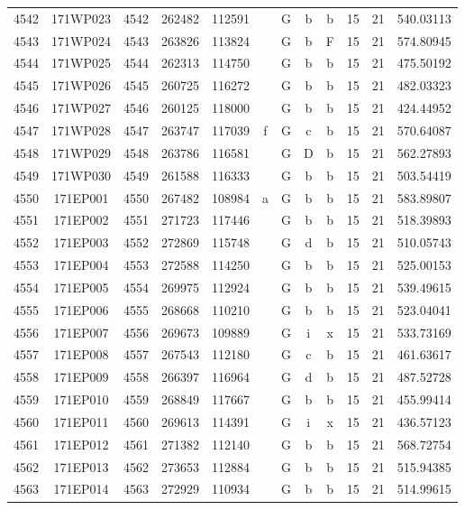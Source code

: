 \begin{tabular}{|*{12}{c|}}
4542 & 171WP023 & 4542 & 262482 & 112591 &  & G & b & b & 15 & 21 & 540.03113 \\ 
4543 & 171WP024 & 4543 & 263826 & 113824 &  & G & b & F & 15 & 21 & 574.80945 \\ 
4544 & 171WP025 & 4544 & 262313 & 114750 &  & G & b & b & 15 & 21 & 475.50192 \\ 
4545 & 171WP026 & 4545 & 260725 & 116272 &  & G & b & b & 15 & 21 & 482.03323 \\ 
4546 & 171WP027 & 4546 & 260125 & 118000 &  & G & b & b & 15 & 21 & 424.44952 \\ 
4547 & 171WP028 & 4547 & 263747 & 117039 & f & G & c & b & 15 & 21 & 570.64087 \\ 
4548 & 171WP029 & 4548 & 263786 & 116581 &  & G & D & b & 15 & 21 & 562.27893 \\ 
4549 & 171WP030 & 4549 & 261588 & 116333 &  & G & b & b & 15 & 21 & 503.54419 \\ 
4550 & 171EP001 & 4550 & 267482 & 108984 & a & G & b & b & 15 & 21 & 583.89807 \\ 
4551 & 171EP002 & 4551 & 271723 & 117446 &  & G & b & b & 15 & 21 & 518.39893 \\ 
4552 & 171EP003 & 4552 & 272869 & 115748 &  & G & d & b & 15 & 21 & 510.05743 \\ 
4553 & 171EP004 & 4553 & 272588 & 114250 &  & G & b & b & 15 & 21 & 525.00153 \\ 
4554 & 171EP005 & 4554 & 269975 & 112924 &  & G & b & b & 15 & 21 & 539.49615 \\ 
4555 & 171EP006 & 4555 & 268668 & 110210 &  & G & b & b & 15 & 21 & 523.04041 \\ 
4556 & 171EP007 & 4556 & 269673 & 109889 &  & G & i & x & 15 & 21 & 533.73169 \\ 
4557 & 171EP008 & 4557 & 267543 & 112180 &  & G & c & b & 15 & 21 & 461.63617 \\ 
4558 & 171EP009 & 4558 & 266397 & 116964 &  & G & d & b & 15 & 21 & 487.52728 \\ 
4559 & 171EP010 & 4559 & 268849 & 117667 &  & G & b & b & 15 & 21 & 455.99414 \\ 
4560 & 171EP011 & 4560 & 269613 & 114391 &  & G & i & x & 15 & 21 & 436.57123 \\ 
4561 & 171EP012 & 4561 & 271382 & 112140 &  & G & b & b & 15 & 21 & 568.72754 \\ 
4562 & 171EP013 & 4562 & 273653 & 112884 &  & G & b & b & 15 & 21 & 515.94385 \\ 
4563 & 171EP014 & 4563 & 272929 & 110934 &  & G & b & b & 15 & 21 & 514.99615 \\ 

\end{tabular}
